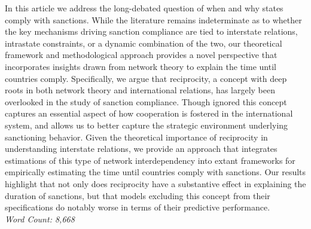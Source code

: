 In this article we address the long-debated question of when and why states comply with sanctions. While the literature remains indeterminate as to whether the key mechanisms driving sanction compliance are tied to interstate relations, intrastate constraints, or a dynamic combination of the two, our theoretical framework and methodological approach provides a novel perspective that incorporates insights drawn from network theory to explain the time until countries comply. Specifically, we argue that reciprocity, a concept with deep roots in both network theory and international relations, has largely been overlooked in the study of sanction compliance. Though ignored this concept captures an essential aspect of how cooperation is fostered in the international system, and allows us to better capture the strategic environment underlying sanctioning behavior. Given the theoretical importance of reciprocity in understanding interstate relations, we provide an approach that integrates estimations of this type of network interdependency into extant frameworks for empirically estimating the time until countries comply with sanctions. Our results highlight that not only does reciprocity have a substantive effect in explaining the duration of sanctions, but that models excluding this concept from their specifications do notably worse in terms of their predictive performance.\\

\noindent \textit{Word Count: 8,668}